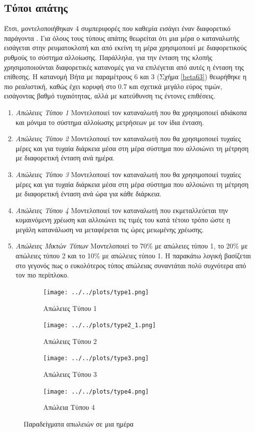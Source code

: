 \subsection{Τύποι απάτης}
Έτσι, μοντελοποιήθηκαν 4 συμπεριφορές που καθεμία εισάγει έναν διαφορετικό παράγοντα \cite{conspatterns}. Για όλους τους τύπους απάτης θεωρείται ότι μια μέρα ο καταναλωτής εισάγεται στην ρευματοκλοπή και από εκείνη τη μέρα χρησιμοποιεί με διαφορετικούς ρυθμούς το σύστημα αλλοίωσης. Παράλληλα, για την ένταση της κλοπής χρησιμοποιούνται διαφορετικές κατανομές για να επιλέγεται από αυτές η ένταση της επίθεσης. Η κατανομή Βήτα με παραμέτρους 6 και 3 (Σχήμα \ref{beta63}) θεωρήθηκε η πιο ρεαλιστική, καθώς έχει κορυφή στο 0.7 και σχετικά μεγάλο εύρος τιμών, εισάγοντας βαθμό τυχαιότητας, αλλά με κατεύθυνση τις έντονες επιθέσεις.
\begin{enumerate}
\item \textit{Απώλειες Τύπου 1} Μοντελοποιεί τον καταναλωτή που θα χρησιμοποιεί αδιάκοπα και μόνιμα το σύστημα αλλοίωσης μετρήσεων με τον ίδια ένταση.
\item \textit{Απώλειες Τύπου 2} Μοντελοποιεί τον καταναλωτή που θα χρησιμοποιεί τυχαίες μέρες και για τυχαία διάρκεια μέσα στη μέρα σύστημα που αλλοιώνει τη μέτρηση με διαφορετική ένταση ανά ημέρα.
\item \textit{Απώλειες Τύπου 3} Μοντελοποιεί τον καταναλωτή που θα χρησιμοποιεί τυχαίες μέρες και για τυχαία διάρκεια μέσα στη μέρα σύστημα που αλλοιώνει τη μέτρηση με διαφορετική ένταση ανά ώρα για κάθε διάρκεια.
\item \textit{Απώλειες Τύπου 4} Μοντελοποιεί τον καταναλωτή που εκμεταλλεύεται την κυμαινόμενη χρέωση και αλλοιώνει τις τιμές του κατά τέτοιο τρόπο ώστε η μεγάλη κατανάλωση να μεταφέρεται τις ώρες μειωμένης χρέωσης.
\item \textit{Απώλειες Μικτών Τύπων} Μοντελοποιεί το 70\% με απώλειες τύπου 1, το 20\% με απώλειες τύπου 2 και το 10\% με απώλειες τύπου 1. Η παρακάτω λογική βασίζεται στο γεγονός πως ο ευκολότερος τύπος απώλειας συναντάται πολύ συχνότερα από τον πιο περίπλοκο. 
\end{enumerate}
\begin{figure}
\begin{subfigure}[b]{0.5\textwidth}
\texttt{[image: ../../plots/type1.png]}
\caption{Απώλειες Τύπου 1 \label{type1loss}}
\end{subfigure}
\quad
\begin{subfigure}[b]{0.5\textwidth}
\texttt{[image: ../../plots/type2\_1.png]}
\caption{Απώλειες Τύπου 2\label{type2loss}}
\end{subfigure}
\quad
\begin{subfigure}[b]{0.5\textwidth}
\texttt{[image: ../../plots/type3.png]}
\caption{Απώλειες Τύπου 3 \label{type3loss}}
\end{subfigure}
\quad
\begin{subfigure}[b]{0.5\textwidth}
\texttt{[image: ../../plots/type4.png]}
\caption{Απώλεια Τύπου 4 \label{type4loss}}
\end{subfigure}
\caption{Παραδείγματα απωλειών σε μια ημέρα}
\label{losstypes}
\end{figure}

